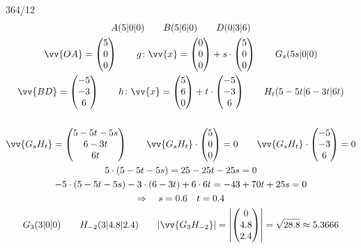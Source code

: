 \begin{exercise}{364/12}
  \begin{gather*}
    A(5|0|0) \qquad B(5|6|0) \qquad D(0|3|6) \\
    \vv{OA} = \begin{pmatrix}5 \\ 0 \\ 0\end{pmatrix} \qquad g \colon \vv{x} = \begin{pmatrix}0 \\ 0 \\ 0\end{pmatrix} + s \cdot \begin{pmatrix}5 \\ 0 \\ 0\end{pmatrix} \qquad G_s(5s|0|0) \\
    \vv{BD} = \begin{pmatrix}-5 \\ -3 \\ 6\end{pmatrix} \qquad h \colon \vv{x} = \begin{pmatrix}5 \\ 6 \\ 0\end{pmatrix} + t \cdot \begin{pmatrix}-5 \\ -3 \\ 6\end{pmatrix} \qquad H_t(5 - 5t|6 - 3t|6t) \\\\
    \vv{G_sH_t} = \begin{pmatrix}5 - 5t - 5s \\ 6 - 3t \\ 6t\end{pmatrix} \qquad \vv{G_sH_t} \cdot \begin{pmatrix}5 \\ 0 \\ 0\end{pmatrix} = 0 \qquad \vv{G_sH_t} \cdot \begin{pmatrix}-5 \\ -3 \\ 6\end{pmatrix} = 0 \\
    5 \cdot (5 - 5t - 5s) = 25 - 25t - 25s = 0 \\
    -5 \cdot (5 - 5t - 5s) - 3 \cdot (6 - 3t) + 6 \cdot 6t = -43 + 70t + 25s = 0 \\
    \Rightarrow\quad s = 0.6 \quad t = 0.4 \\
    G_3(3|0|0) \qquad H_{-2}(3|4.8|2.4) \qquad |\vv{G_3H_{-2}}| = \left|\begin{pmatrix}0 \\ 4.8 \\ 2.4\end{pmatrix}\right| = \sqrt{28.8} \approx 5.3666
  \end{gather*}
\end{exercise}
